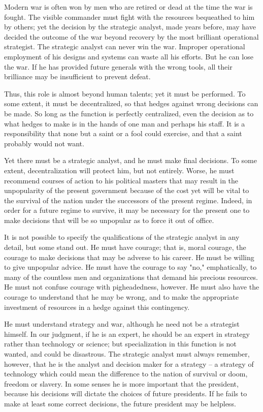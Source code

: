 Modern war is often won by men who are retired or dead at the time the war is fought. The visible commander must fight with the resources bequeathed to him by others; yet the decision by the strategic analyst, made years before, may have decided the outcome of the war beyond recovery by the most brilliant operational strategist. The strategic analyst can never win the war. Improper operational employment of his designs and systems can waste all his efforts. But he can lose the war. If he has provided future generals with the wrong tools, all their brilliance may be insufficient to prevent defeat.

Thus, this role is almost beyond human talents; yet it must be performed. To some extent, it must be decentralized, so that hedges against wrong decisions can be made. So long as the function is perfectly centralized, even the decision as to what hedges to make is in the hands of one man and perhaps his staff. It is a responsibility that none but a saint or a fool could exercise, and that a saint probably would not want.

Yet there must be a strategic analyst, and he must make final decisions. To some extent, decentralization will protect him, but not entirely. Worse, he must recommend courses of action to his political masters that may result in the unpopularity of the present government because of the cost yet will be vital to the survival of the nation under the successors of the present regime. Indeed, in order for a future regime to survive, it may be necessary for the present one to make decisions that will be so unpopular as to force it out of office.

It is not possible to specify the qualifications of the strategic analyst in any detail, but some stand out. He must have courage; that is, moral courage, the courage to make decisions that may be adverse to his career. He must be willing to give unpopular advice. He must have the courage to say "no," emphatically, to many of the countless men and organizations that demand his precious resources. He must not confuse courage with pigheadedness, however. He must also have the courage to understand that he may be wrong, and to make the appropriate investment of resources in a hedge against this contingency.

He must understand strategy and war, although he need not be a strategist himself. In our judgment, if he is an expert, he should be an expert in strategy rather than technology or science; but specialization in this function is not wanted, and could be disastrous. The strategic analyst must always remember, however, that he is the analyst and decision maker for a strategy -- a strategy of technology which could mean the difference to the nation of survival or doom, freedom or slavery. In some senses he is more important that the president, because his decisions will dictate the choices of future presidents. If he fails to make at least some correct decisions, the future president may be helpless.

